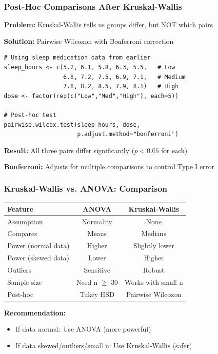 \documentclass{beamer}
\begin{document}
\begin{frame}[fragile]
\frametitle{Post-Hoc Comparisons After Kruskal-Wallis}
\textbf{Problem:} Kruskal-Wallis tells us groups differ, but NOT which pairs

\vspace{0.3cm}
\textbf{Solution:} Pairwise Wilcoxon with Bonferroni correction

\vspace{0.3cm}
\begin{small}
\begin{verbatim}
# Using sleep medication data from earlier
sleep_hours <- c(5.2, 6.1, 5.8, 6.3, 5.5,   # Low
                 6.8, 7.2, 7.5, 6.9, 7.1,   # Medium
                 7.8, 8.2, 8.5, 7.9, 8.1)   # High
dose <- factor(rep(c("Low","Med","High"), each=5))

# Post-hoc test
pairwise.wilcox.test(sleep_hours, dose,
                     p.adjust.method="bonferroni")
\end{verbatim}
\end{small}

\textbf{Result:} All three pairs differ significantly ($p < 0.05$ for each)

\vspace{0.3cm}
\textbf{Bonferroni:} Adjusts for multiple comparisons to control Type I error
\end{frame}

\begin{frame}
\frametitle{Kruskal-Wallis vs. ANOVA: Comparison}
\begin{center}
\begin{tabular}{lcc}
\toprule
\textbf{Feature} & \textbf{ANOVA} & \textbf{Kruskal-Wallis} \\
\midrule
Assumption & Normality & None \\
Compares & Means & Medians \\
Power (normal data) & Higher & Slightly lower \\
Power (skewed data) & Lower & Higher \\
Outliers & Sensitive & Robust \\
Sample size & Need n $\geq$ 30 & Works with small n \\
Post-hoc & Tukey HSD & Pairwise Wilcoxon \\
\bottomrule
\end{tabular}
\end{center}

\vspace{0.5cm}
\textbf{Recommendation:}
\begin{itemize}
\item If data normal: Use ANOVA (more powerful)
\item If data skewed/outliers/small n: Use Kruskal-Wallis (safer)
\end{itemize}
\end{frame}
\end{document}
